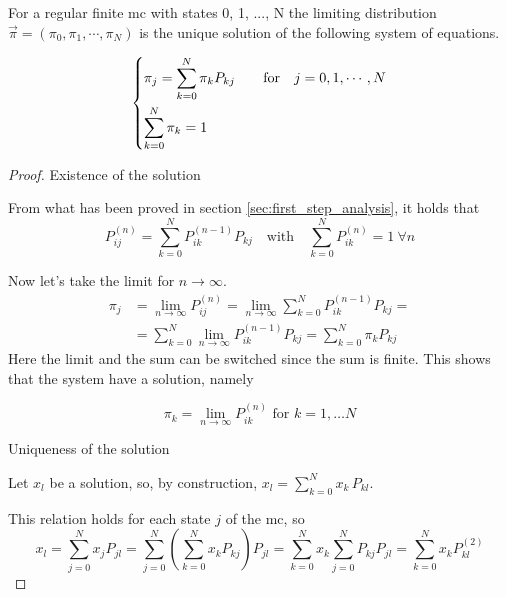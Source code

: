 \begin{theorem} \label{th:regular_pi}
	For a regular finite \gls{mc} with states 0, 1, ..., N the limiting distribution $\vec{\pi} = (\pi_0,\pi_1,\cdots,\pi_N)$ is the unique solution of the following system of equations.

	\begin{equation*}
		\begin{dcases}
			\pi_j = \sum_{k=0}^N \pi_k P_{k j}
				& \quad \text{for} \quad j = 0,1, \cdots, N \\
			\sum_{k=0}^N \pi_k = 1
		\end{dcases}
	\end{equation*}

\end{theorem}

\begin{proof}
	\proofpart Existence of the solution

	From what has been proved in section \ref{sec:first_step_analysis}, it holds that
	\begin{equation}
			P_{i j}^{(n)} = \sum_{k=0}^N P_{ik}^{(n-1)} P_{k j}
		\quad \text{with} \quad \sum_{k=0}^N P_{ik}^{(n)} = 1 ~\forall n
	\end{equation}

	Now let's take the limit for $ n \to \infty $.
	\begin{equation}
		\begin{split}
			\pi_j &= \lim_{n \to \infty} P_{ij}^{(n)} = \lim_{n \to \infty} \sum_{k=0}^N P_{ik}^{(n-1)} P_{k j
			} =\\
			&= \sum_{k=0}^N \lim_{n \to \infty} P_{ik}^{(n-1)} P_{k j
			} = \sum_{k=0}^N \pi_k P_{kj}
		\end{split}
	\end{equation}
	Here the limit and the sum can be switched since the sum is finite.
	This shows that the system have a solution, namely

	\begin{equation*}
		\pi_k = \lim_{n \to \infty} P_{ik}^{(n)} \text{ for } k = 1, \ldots N
	\end{equation*}

\proofpart Uniqueness of the solution

	Let $x_l$ be a solution, so, by construction, $x_l = \sum_{k=0}^N x_k \, P_{kl}$.

	This relation holds for each state $j$ of the \gls{mc}, so
	\begin{equation}
			x_l = \sum_{j=0}^N x_j P_{jl} =  \sum_{j=0}^N \left( \sum_{k=0}^N x_k P_{kj} \right) P_{jl} =  \sum_{k=0}^N x_k \sum_{j=0}^N P_{kj} P_{jl} = \sum_{k=0}^N x_k P_{kl}^{(2)}
	\end{equation}


\end{proof}
